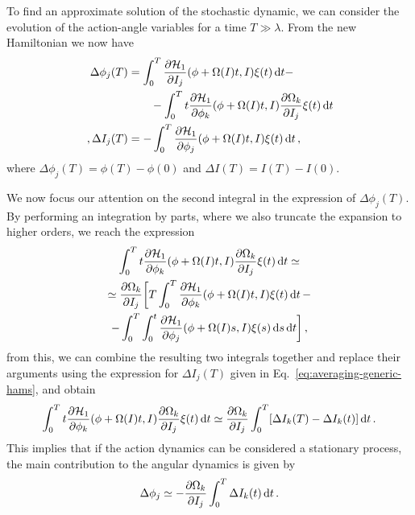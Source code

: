 To find an approximate solution of the stochastic dynamic, we can consider the evolution of the action-angle variables for a time \(T\gg \lambda\). From the new Hamiltonian we now have
\begin{equation}
	\begin{aligned}
		\Delta\phi_j(T) &= \int_0^T\pdv{\mathcal{H}_1}{I_j}\/(\phi+\Omega(I)t, I)\xi(t)\,\mathrm{d}t -\\
		&\qquad - \int_0^T t\pdv{\mathcal{H}_1}{\phi_k}\/(\phi + \Omega(I)t,I)\pdv{\Omega_k}{I_j}\xi(t)\,\mathrm{d}t\\ \,,
		\Delta I_j(T) &= -\int_0^T\pdv{\mathcal{H}_1}{\phi_j}\/(\phi+\Omega(I)t,I)\xi(t)\,\mathrm{d}t\,,
	\end{aligned}
	\label{eq:averaging-generic-hams}
\end{equation}
where \(\Delta \phi_j(T)=\phi(T)-\phi(0)\) and \(\Delta I(T)=I(T)-I(0)\).

We now focus our attention on the second integral in the expression of \(\Delta\phi_j(T)\). By performing an integration by parts, where we also truncate the expansion to higher orders, we reach the expression
\begin{multline}
	\int_0^T t\pdv{\mathcal{H}_1}{\phi_k}\/(\phi+\Omega(I)t,I)\pdv{\Omega_k}{I_j}\xi(t)\,\mathrm{d}t \simeq \\
	\simeq \pdv{\Omega_k}{I_j}\/\bigg[T\int_0^T\pdv{\mathcal{H}_1}{\phi_k}\/(\phi+\Omega(I)t,I)\xi(t)\,\mathrm{d}t\, - \\
	- \int_0^T\int_0^t\pdv{\mathcal{H}_1}{\phi_j}\/(\phi+\Omega(I)s, I)\xi(s)\,\mathrm{d}s\,\mathrm{d}t\bigg]\,,
\end{multline}
from this, we can combine the resulting two integrals together and replace their arguments using the expression for $\Delta I_j(T)$ given in Eq.~\eqref{eq:averaging-generic-hams}, and obtain
\begin{equation}
	\int_0^T t\pdv{\mathcal{H}_1}{\phi_k}\/(\phi+\Omega(I)t,I)\pdv{\Omega_k}{I_j}\xi(t)\,\mathrm{d}t \simeq \pdv{\Omega_k}{I_j}\int_0^T[\Delta I_k(T)-\Delta I_k(t)]\,\mathrm{d}t\,.
\end{equation}
This implies that if the action dynamics can be considered a stationary process, the main contribution to the angular dynamics is given by
\begin{equation}
	\Delta \phi_j \simeq -\pdv{\Omega_k}{I_j}\int_0^T\Delta I_k(t)\,\mathrm{d}t\,.
\end{equation}

